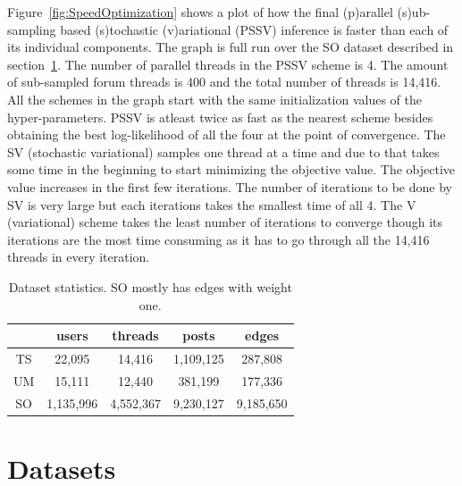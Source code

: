 \documentclass{sig-alternate}
\begin{document}
Figure~\ref{fig:SpeedOptimization} 
shows a plot of how the final (p)arallel (s)ub-sampling based (s)tochastic
(v)ariational (PSSV) inference is faster than each of its individual components.
The graph is full run over the SO dataset described in section~\ref{sec:dataset}.
The number of parallel threads in the PSSV scheme is 4. The amount of
sub-sampled forum threads is 400 and the total number of threads is 14,416.
All the schemes in the graph start with the same initialization values of the
hyper-parameters. PSSV is atleast twice as fast as the nearest scheme besides
obtaining the best log-likelihood of all the four at the point of convergence.
The SV (stochastic variational) samples one thread at a time and due to that
takes some time in the beginning to start minimizing the objective value. The
objective value increases in the first few iterations. The number of iterations
to be done by SV is very large but each iterations takes the smallest time of
all 4. The V (variational) scheme takes the least number of iterations to
converge though its iterations are the most time consuming as it has to go
through all the 14,416 threads in every iteration. 
\begin{table}
\begin{center}
\begin{tabular}{c|c|c|c|c|}
 & users & threads & posts & edges\\\hline
 TS & 22,095 & 14,416 & 1,109,125 & 287,808\\\hline
 UM & 15,111 & 12,440 & 381,199 & 177,336\\\hline
 SO & 1,135,996 & 4,552,367 & 9,230,127 & 9,185,650\\\hline
\end{tabular}
\label{tab:dataStats}
\end{center}
\caption{Dataset statistics. SO mostly has edges with weight one.}
\end{table}

\section{Datasets}
\label{sec:dataset}
\end{document}

